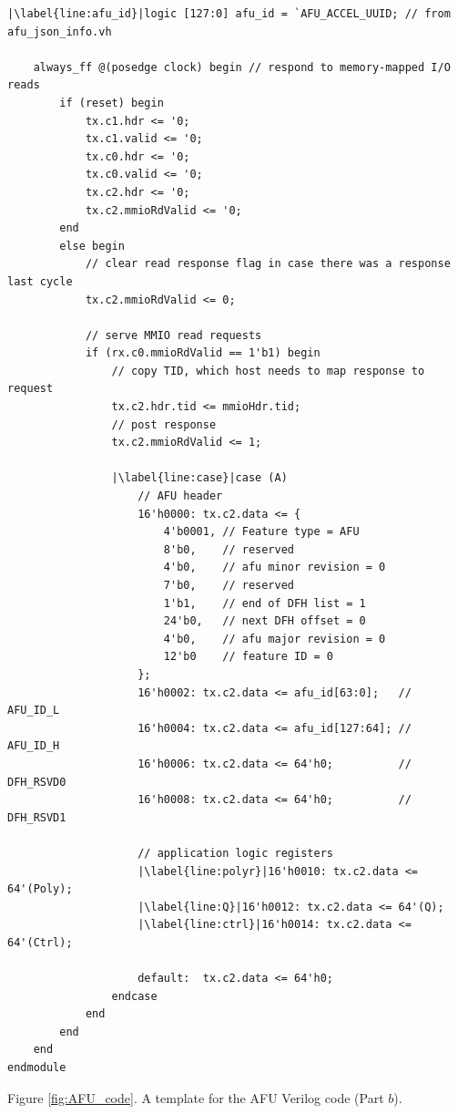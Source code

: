 \documentclass[epsfig,10pt,fullpage]{article}
\begin{document}
\begin{minipage}[t]{15.5 cm}
\begin{lstlisting}[name=AFU]
    |\label{line:afu_id}|logic [127:0] afu_id = `AFU_ACCEL_UUID; // from afu_json_info.vh

    always_ff @(posedge clock) begin // respond to memory-mapped I/O reads
        if (reset) begin
            tx.c1.hdr <= '0;
            tx.c1.valid <= '0;
            tx.c0.hdr <= '0;
            tx.c0.valid <= '0;
            tx.c2.hdr <= '0;
            tx.c2.mmioRdValid <= '0;
        end
        else begin
            // clear read response flag in case there was a response last cycle
            tx.c2.mmioRdValid <= 0;

            // serve MMIO read requests
            if (rx.c0.mmioRdValid == 1'b1) begin
                // copy TID, which host needs to map response to request
                tx.c2.hdr.tid <= mmioHdr.tid;
                // post response
                tx.c2.mmioRdValid <= 1;

                |\label{line:case}|case (A)
                    // AFU header
                    16'h0000: tx.c2.data <= {
                        4'b0001, // Feature type = AFU
                        8'b0,    // reserved
                        4'b0,    // afu minor revision = 0
                        7'b0,    // reserved
                        1'b1,    // end of DFH list = 1
                        24'b0,   // next DFH offset = 0
                        4'b0,    // afu major revision = 0
                        12'b0    // feature ID = 0
                    };
                    16'h0002: tx.c2.data <= afu_id[63:0];   // AFU_ID_L
                    16'h0004: tx.c2.data <= afu_id[127:64]; // AFU_ID_H
                    16'h0006: tx.c2.data <= 64'h0;          // DFH_RSVD0
                    16'h0008: tx.c2.data <= 64'h0;          // DFH_RSVD1

                    // application logic registers
                    |\label{line:polyr}|16'h0010: tx.c2.data <= 64'(Poly);
                    |\label{line:Q}|16'h0012: tx.c2.data <= 64'(Q);
                    |\label{line:ctrl}|16'h0014: tx.c2.data <= 64'(Ctrl);

                    default:  tx.c2.data <= 64'h0;
                endcase
            end
        end
    end
endmodule
\end{lstlisting}
\begin{center}
Figure \ref{fig:AFU_code}. A template for the AFU Verilog code (Part $b$).
\end{center}
\end{minipage}
\end{document}
